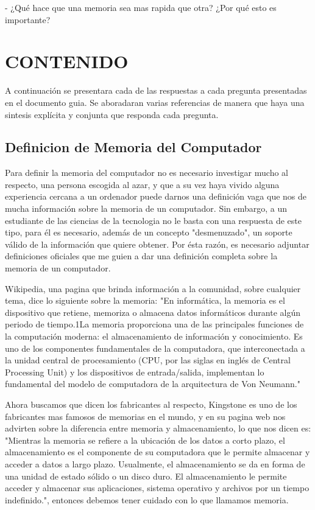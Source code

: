 \documentclass{article}
\begin{document}
- ¿Qué hace que una memoria sea mas rapida que otra? ¿Por qué esto es importante?

\section{CONTENIDO} \label{contenido}
A continuación se presentara cada de las respuestas a cada pregunta presentadas en el documento guia.\cite{referencia}
Se aboradaran varias referencias de manera que haya una sintesis explícita y conjunta que responda cada pregunta.

\subsection{Definicion de Memoria del Computador}\label{pregunta1}
Para definir la memoria del computador no es necesario investigar mucho al respecto, una persona escogida al azar, y que a su vez haya vivido alguna experiencia cercana a un ordenador puede darnos una definición vaga que nos de mucha información sobre la memoria de un computador. Sin embargo, a un estudiante de las ciencias de la tecnologia no le basta con una respuesta de este tipo, para él es necesario, además de un concepto "desmenuzado", un soporte válido de la información que quiere obtener. Por ésta razón, es necesario adjuntar definiciones oficiales que me guien a dar una definición completa sobre la memoria de un computador.

Wikipedia, una pagina que brinda información a la comunidad, sobre cualquier tema, dice lo siguiente sobre la memoria:
"En informática, la memoria es el dispositivo que retiene, memoriza o almacena datos informáticos durante algún periodo de tiempo.1​La memoria proporciona una de las principales funciones de la computación moderna: el almacenamiento de información y conocimiento. Es uno de los componentes fundamentales de la computadora, que interconectada a la unidad central de procesamiento (CPU, por las siglas en inglés de Central Processing Unit) y los dispositivos de entrada/salida, implementan lo fundamental del modelo de computadora de la arquitectura de Von Neumann."\cite{wikipedia}

Ahora buscamos que dicen los fabricantes al respecto, Kingstone es uno de los fabricantes mas famosos de memorias en el mundo, y en su pagina web nos advirten sobre la diferencia entre memoria y almacenamiento, lo que nos dicen es: "Mientras la memoria se refiere a la ubicación de los datos a corto plazo, el almacenamiento es el componente de su computadora que le permite almacenar y acceder a datos a largo plazo. Usualmente, el almacenamiento se da en forma de una unidad de estado sólido o un disco duro. El almacenamiento le permite acceder y almacenar sus aplicaciones, sistema operativo y archivos por un tiempo indefinido.", entonces debemos tener cuidado con lo que llamamos memoria.\cite{kingstone}
\end{document}
